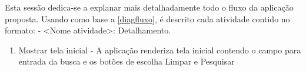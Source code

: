 Esta sessão dedica-se a explanar mais detalhadamente todo o fluxo da aplicação proposta. Usando como base a \autoref{diagfluxo}, é descrito cada atividade contido no formato: - <Nome atividade>: Detalhamento.

\begin{enumerate}
	\item Mostrar tela inicial - A aplicação renderiza tela inicial contendo o campo para entrada da busca e os botões de escolha Limpar e Pesquisar
\end{enumerate}
